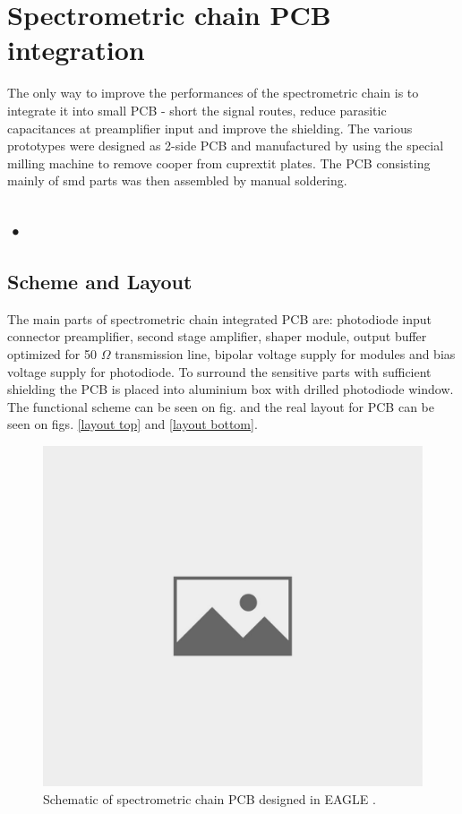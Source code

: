 \chapter{Spectrometric chain PCB integration}
The only way to improve the performances of the spectrometric chain is to integrate it into small PCB - short the signal routes, reduce parasitic capacitances at preamplifier input and improve the shielding. The various prototypes were designed as 2-side PCB and manufactured by using the special milling machine to remove cooper from cuprextit plates. The PCB consisting mainly of smd parts was then assembled by manual soldering.

\section{•} 



\section{Scheme and Layout}
The main parts of spectrometric chain integrated PCB are: photodiode input connector preamplifier, second stage amplifier, shaper module, output buffer optimized for 50 $\Omega$ transmission line, bipolar voltage supply for modules and bias voltage supply for photodiode. To surround the sensitive parts with sufficient shielding the PCB is placed into aluminium box with drilled photodiode window. The functional scheme can be seen on fig. and the real layout for PCB can be seen on figs. \ref{layout top} and \ref{layout bottom}.

\begin{figure}[H]
 \centering
 \includegraphics[scale=0.35, angle = 0]{./pictures/NoPicture.jpg}
 \caption{Schematic of spectrometric chain PCB designed in EAGLE \cite{eagle}.}
 \label{schematic}
 
\end{figure}



